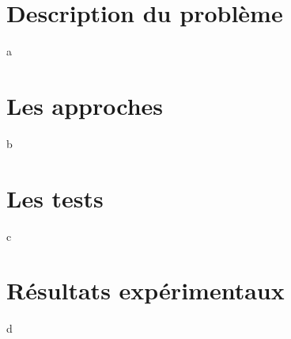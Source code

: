 \documentclass[10pt,a4paper]{article}
\begin{document}
\section{Description du problème}
a

\section{Les approches}
b

\section{Les tests}
c

\section{Résultats expérimentaux}
d
\end{document}
